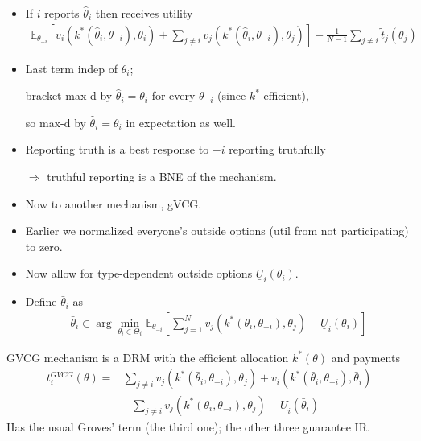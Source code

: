 \documentclass[english]{beamer}		%
\def\lyxframeend{} %
\begin{document}
\begin{itemize}
	\item If $i$ reports $\hat{\theta}_i$ then receives utility
	{\footnotesize 
		\vspace{-0.5em}\begin{align*}
		\mathbb{E}_{\theta_{-i}} \left[ v_i(k^*(\hat{\theta}_i, \theta_{-i}), \theta_i) + \sum_{j \neq i} v_j(k^*(\hat{\theta}_i, \theta_{-i}), \theta_j) \right] - \frac{1}{N-1} \sum_{j \neq i} \tilde{t}_j (\theta_j)
	 	\end{align*}\vspace{-1em}
	}
	\item Last term indep of $\hat{\theta}_i$; 
	
	bracket max-d by $\hat{\theta}_i = \theta_i$ for every $\theta_{-i}$ (since $k^*$ efficient), 
	
	so max-d by $\hat{\theta}_i = \theta_i$ in expectation as well.
	
	\item Reporting truth is a best response to $-i$ reporting truthfully 
	
	$\Rightarrow$ truthful reporting is a BNE of the mechanism.
\end{itemize}
\lyxframeend


\begin{itemize}
	\item Now to another mechanism, gVCG.
	\item Earlier we normalized everyone's outside options (util from not participating) to zero.
	\item Now allow for type-dependent outside options $\underline{U}_i (\theta_i)$.
	\pause\medskip
	\item Define  $\bar{\theta}_i$ as
	\begin{align*}
	\bar{\theta}_i \in \arg \min_{\theta_i \in \Theta_i} \mathbb{E}_{\theta_{-i}} \left[ \sum_{j=1}^{N} v_j (k^*(\theta_i,\theta_{-i}),\theta_j) - \underline{U}_i (\theta_i) \right]
	\end{align*}
\end{itemize}
\lyxframeend


GVCG mechanism is a DRM with the efficient allocation $k^*(\theta)$ and payments
\begin{align*}
t_i^{GVCG} (\theta) =& \sum_{j \neq i} v_j (k^*(\bar{\theta}_i,\theta_{-i}),\theta_j) + v_i (k^*(\bar{\theta}_i,\theta_{-i}),\bar{\theta}_i)
\\& - \sum_{j \neq i} v_j (k^*(\theta_i,\theta_{-i}),\theta_j) - \underline{U}_i (\bar{\theta}_i)
\end{align*}
\pause
Has the usual Groves' term (the third one); the other three guarantee IR.
\lyxframeend
\end{document}
